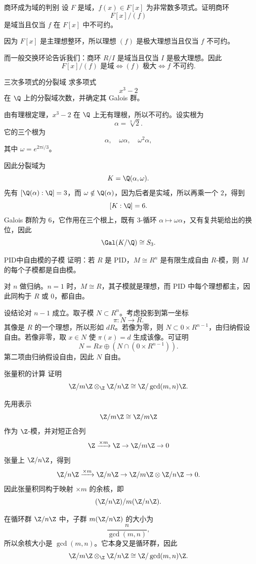 \begin{problem}{商环成为域的判别}
\medium
设 $F$ 是域，$f(x)\in F[x]$ 为非常数多项式。证明商环
\[
F[x]/(f)
\]
是域当且仅当 $f$ 在 $F[x]$ 中不可约。
\end{problem}
\begin{solution}
因为 $F[x]$ 是主理想整环，所以理想 $(f)$ 是极大理想当且仅当 $f$ 不可约。

而一般交换环论告诉我们：商环 $R/I$ 是域当且仅当 $I$ 是极大理想。因此
\[
F[x]/(f)\text{ 是域}
\iff (f)\text{ 极大}
\iff f\text{ 不可约}.
\]
\end{solution}

\begin{problem}{三次多项式的分裂域}
\medium
求多项式
\[
x^3-2
\]
在 $\Q$ 上的分裂域次数，并确定其 Galois 群。
\end{problem}
\begin{solution}
由有理根定理，$x^3-2$ 在 $\Q$ 上无有理根，所以不可约。设实根为
\[
\alpha=\sqrt[3]{2}.
\]
它的三个根为
\[
\alpha,\quad \omega\alpha,\quad \omega^2\alpha,
\]
其中 $\omega=e^{2\pi i/3}$。

因此分裂域为
\[
K=\Q(\alpha,\omega).
\]
先有 $[\Q(\alpha):\Q]=3$，而 $\omega\notin\Q(\alpha)$，因为后者是实域，所以再乘一个 $2$，得到
\[
[K:\Q]=6.
\]
Galois 群阶为 $6$，它作用在三个根上，既有 $3$-循环 $\alpha\mapsto\omega\alpha$，又有复共轭给出的换位，因此
\[
\Gal(K/\Q)\cong S_3.
\]
\end{solution}

\begin{problem}{PID中自由模的子模}
\medium
证明：若 $R$ 是 PID，$M\cong R^n$ 是有限生成自由 $R$-模，则 $M$ 的每个子模都是自由模。
\end{problem}
\begin{solution}
对 $n$ 做归纳。$n=1$ 时，$M\cong R$，其子模就是理想，而 PID 中每个理想都主，因此同构于 $R$ 或 $0$，都自由。

设结论对 $n-1$ 成立。取子模 $N\subset R^n$。考虑投影到第一坐标
\[
\pi:N\to R.
\]
其像是 $R$ 的一个理想，所以形如 $dR$。若像为零，则 $N\subset0\times R^{n-1}$，由归纳假设自由。若像非零，取 $x\in N$ 使 $\pi(x)=d$ 生成该像。可证明
\[
N=Rx\oplus (N\cap (0\times R^{n-1})).
\]
第二项由归纳假设自由，因此 $N$ 自由。
\end{solution}

\begin{problem}{张量积的计算}
\medium
证明
\[
\Z/m\Z\otimes_\Z \Z/n\Z\cong \Z/\gcd(m,n)\Z.
\]
\end{problem}
\begin{solution}
先用表示
\[
\Z/m\Z\cong \Z/m\Z
\]
作为 $\Z$-模，并对短正合列
\[
\Z\xrightarrow{\times m}\Z\to\Z/m\Z\to0
\]
张量上 $\Z/n\Z$，得到
\[
\Z/n\Z\xrightarrow{\times m}\Z/n\Z\to \Z/m\Z\otimes \Z/n\Z\to0.
\]
因此张量积同构于映射 $\times m$ 的余核，即
\[
(\Z/n\Z)/m(\Z/n\Z).
\]

在循环群 $\Z/n\Z$ 中，子群 $m(\Z/n\Z)$ 的大小为
\[
\frac{n}{\gcd(m,n)},
\]
所以余核大小是 $\gcd(m,n)$。它本身又是循环群，因此
\[
\Z/m\Z\otimes_\Z\Z/n\Z\cong\Z/\gcd(m,n)\Z.
\]
\end{solution}

